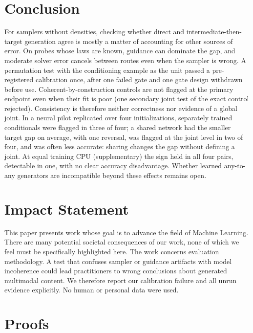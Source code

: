 \documentclass{article}
\theoremstyle{plain}
\theoremstyle{definition}
\theoremstyle{remark}
\begin{document}
\section{Conclusion}
\label{sec:conclusion}
For samplers without densities, checking whether direct and intermediate-then-target generation agree is mostly a matter of accounting for other sources of error.
On probes whose laws are known, guidance can dominate the gap, and moderate solver error cancels between routes even when the sampler is wrong.
A permutation test with the conditioning example as the unit passed a pre-registered calibration once, after one failed gate and one gate design withdrawn before use.
Coherent-by-construction controls are not flagged at the primary endpoint even when their fit is poor (one secondary joint test of the exact control rejected). Consistency is therefore neither correctness nor evidence of a global joint.
In a neural pilot replicated over four initializations, separately trained conditionals were flagged in three of four; a shared network had the smaller target gap on average, with one reversal, was flagged at the joint level in two of four, and was often less accurate: sharing changes the gap without defining a joint.
At equal training CPU (supplementary) the sign held in all four pairs, detectable in one, with no clear accuracy disadvantage.
Whether learned any-to-any generators are incompatible beyond these effects remains open.\label{conc:end}

\section*{Impact Statement}
This paper presents work whose goal is to advance the field of Machine Learning. There are many potential societal consequences of our work, none of which we feel must be specifically highlighted here.
The work concerns evaluation methodology. A test that confuses sampler or guidance artifacts with model incoherence could lead practitioners to wrong conclusions about generated multimodal content. We therefore report our calibration failure and all unrun evidence explicitly.
No human or personal data were used.




\newpage
\appendix
\onecolumn

\section{Proofs}
\label{app:proofs}
\end{document}
